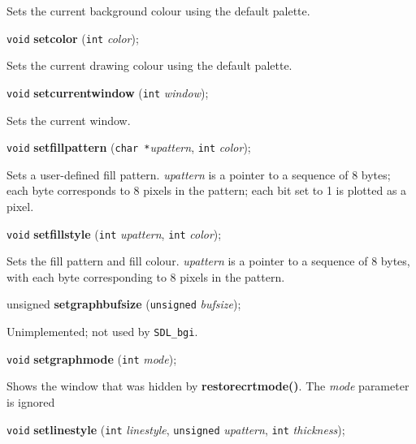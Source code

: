 \documentclass[a4paper,11pt]{article}
\newcommand{\SDLbgi}{\texttt{SDL\_bgi}}
\newcommand{\V}{\texttt{void}}      %
\newcommand{\I}{\texttt{int}}       %
\newcommand{\C}{\texttt{char *}}    %
\newcommand{\func}[1]{\textbf{#1}}  %
\newcommand{\A}[1]{\emph{#1}}       %
\newenvironment{bgi}
{ %
  \begin{snugshade}
}
{ %
  \end{snugshade}
}
\begin{document}
Sets the current background colour using the default palette.


\begin{bgi}
\V{} \func{setcolor} (\I{} \A{color});
\end{bgi}

Sets the current drawing colour using the default palette.


\begin{bgi}
\V{} \func{setcurrentwindow} (\I{} \A{window});
\end{bgi}

Sets the current window.


\begin{bgi}
\V{} \func{setfillpattern} (\C{}\A{upattern}, \I{} \A{color}); 
\end{bgi}

Sets a user-defined fill pattern. \A{upattern} is a pointer to a
sequence of 8 bytes; each byte corresponds to 8 pixels in the pattern;
each bit set to 1 is plotted as a pixel.


\begin{bgi}
\V{} \func{setfillstyle} (\I{} \A{upattern}, \I{} \A{color}); 
\end{bgi}

Sets the fill pattern and fill colour. \A{upattern} is a pointer to a
sequence of 8 bytes, with each byte corresponding to 8 pixels in the
pattern.


\begin{bgi}
unsigned \func{setgraphbufsize} (\texttt{unsigned} \A{bufsize}); 
\end{bgi}

Unimplemented; not used by \SDLbgi.


\begin{bgi}
\V{} \func{setgraphmode} (\I{} \A{mode}); 
\end{bgi}

Shows the window that was hidden by \func{restorecrtmode()}. The
\A{mode} parameter is ignored


\begin{bgi}
\V{} \func{setlinestyle} (\I{} \A{linestyle}, \texttt{unsigned}
\A{upattern}, \I{} \A{thickness});
\end{bgi}
\end{document}
